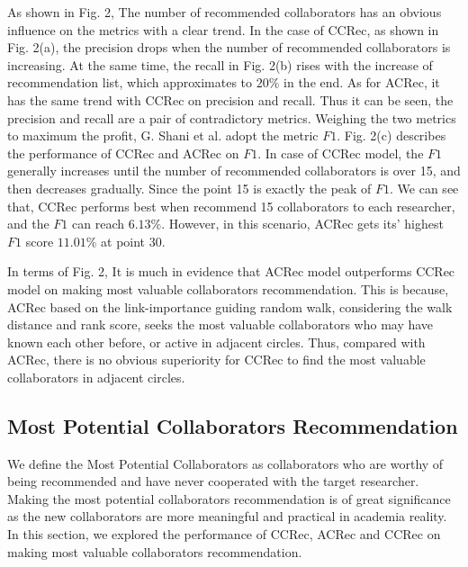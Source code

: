 \documentclass{acm_proc_article-sp}
\begin{document}
As shown in Fig. 2, The number of recommended collaborators has an obvious influence on the metrics with a clear trend. In the case of CCRec, as shown in Fig. 2(a), the precision drops when the number of recommended collaborators is increasing. At the same time, the recall in Fig. 2(b) rises with the increase of recommendation list, which approximates to $20\%$ in the end. As for ACRec, it has the same trend with CCRec on precision and recall. Thus it can be seen, the precision and recall are a pair of contradictory metrics. Weighing the two metrics to maximum the profit, G. Shani et al. \cite{shani2011evaluating} adopt the metric $F1$. Fig. 2(c) describes the performance of CCRec and ACRec on $F1$. In case of CCRec model, the $F1$ generally increases until the number of recommended collaborators is over 15, and then decreases gradually. Since the point 15 is exactly the peak of $F1$. We can see that, CCRec performs best when recommend 15 collaborators to each researcher, and the $F1$ can reach $6.13\%$. However, in this scenario, ACRec gets its' highest $F1$ score $11.01\%$ at point 30.

In terms of Fig. 2, It is  much in evidence that ACRec model outperforms CCRec model on making most valuable collaborators recommendation. This is because, ACRec based on the link-importance guiding random walk, considering the walk distance and rank score, seeks the most valuable collaborators who may have known each other before, or active in adjacent circles. Thus, compared with ACRec, there is no obvious superiority for CCRec to find the most valuable collaborators in adjacent circles.

\subsection{Most Potential Collaborators Recommendation}
We define the Most Potential Collaborators as collaborators who are worthy of being recommended and have never cooperated with the target researcher. Making the most potential collaborators recommendation is of great significance as the new collaborators are more meaningful and practical in academia reality. In this section, we explored the performance of CCRec, ACRec and CCRec on making most valuable collaborators recommendation.
\end{document}
